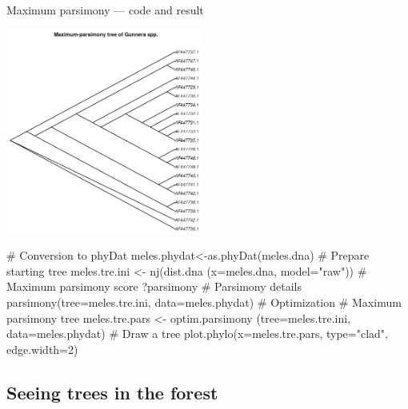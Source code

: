 \documentclass[compress, ucs, xelatex, 11pt, xcolor=svgnames, aspectratio=169,
	hyperref={
		bookmarks=true,
		unicode=true,
		colorlinks=true,
		pdftitle={Molecular data in R},
		plainpages=false,
		pdfauthor={Vojtech Zeisek},
		pdfsubject={Course about phylogeny and evolution in R},
		pdfcreator={XeLaTeX},
		pdfkeywords={R, evolution, phylogeny, molecular data},
		linkcolor=Crimson, %
		anchorcolor=Magenta, %
		citecolor=Magenta, %
		filecolor=Magenta, %
		menucolor=Magenta, %
		urlcolor=DodgerBlue, %
		pdftex},
	url={hyphens, lowtilde} %
	]{beamer}
\begin{document}
\begin{frame}[fragile]{Maximum parsimony --- code and result}
	\begin{multicols}{2}
		\vfil
		\includegraphics[height=6.75cm]{parsimony.png}
		\vfil
		\begin{spluscode}
    # Conversion to phyDat
    meles.phydat<-as.phyDat(meles.dna)
    # Prepare starting tree
    meles.tre.ini <- nj(dist.dna
      (x=meles.dna, model="raw"))
    # Maximum parsimony score
    ?parsimony # Parsimony details
    parsimony(tree=meles.tre.ini,
      data=meles.phydat)
    # Optimization
    # Maximum parsimony tree
    meles.tre.pars <- optim.parsimony
      (tree=meles.tre.ini,
      data=meles.phydat)
    # Draw a tree
    plot.phylo(x=meles.tre.pars,
      type="clad", edge.width=2)
		\end{spluscode}
	\end{multicols}
\end{frame}

\subsection{Seeing trees in the forest}
\end{document}
